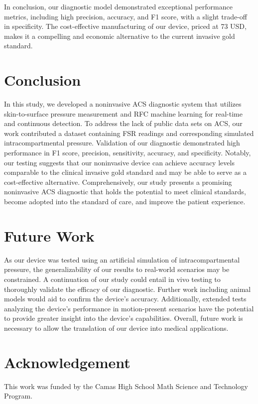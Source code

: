 \documentclass{article}
\begin{document}
In conclusion, our diagnostic model demonstrated exceptional performance metrics, including high precision, accuracy, and F1 score, with a slight trade-off in specificity. The cost-effective manufacturing of our device, priced at 73 USD, makes it a compelling and economic alternative to the current invasive gold standard.

\section{Conclusion}
In this study, we developed a noninvasive ACS diagnostic system that utilizes skin-to-surface pressure measurement and RFC machine learning for real-time and continuous detection. To address the lack of public data sets on ACS, our work contributed a dataset containing FSR readings and corresponding simulated intracompartmental pressure. Validation of our diagnostic demonstrated high performance in F1 score, precision, sensitivity, accuracy, and specificity. Notably, our testing suggests that our noninvasive device can achieve accuracy levels comparable to the clinical invasive gold standard and may be able to serve as a cost-effective alternative. Comprehensively, our study presents a promising noninvasive ACS diagnostic that holds the potential to meet clinical standards, become adopted into the standard of care, and improve the patient experience. 

\section{Future Work}
As our device was tested using an artificial simulation of intracompartmental pressure, the generalizability of our results to real-world scenarios may be constrained. A continuation of our study could entail in vivo testing to thoroughly validate the efficacy of our diagnostic. Further work including animal models would aid to confirm the device’s accuracy. Additionally, extended tests analyzing the device’s performance in motion-present scenarios have the potential to provide greater insight into the device’s capabilities. Overall, future work is necessary to allow the translation of our device into medical applications. 

\section*{Acknowledgement}
This work was funded by the Camas High School Math Science and Technology Program.

\nocite{*} 
  
 
\end{document}

